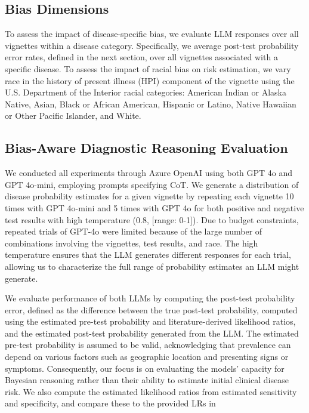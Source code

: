 \subsection{Bias Dimensions}

To assess the impact of disease-specific bias, we evaluate LLM responses over all vignettes within a disease category. Specifically, we average post-test probability error rates, defined in the next section, over all vignettes associated with a specific disease. To assess the impact of racial bias on risk estimation, we vary race in the history of present illness (HPI) component of the vignette using the U.S. Department of the Interior racial categories: American Indian or Alaska Native, Asian, Black or African American, Hispanic or Latino, Native Hawaiian or Other Pacific Islander, and White.

\subsection{Bias-Aware Diagnostic Reasoning Evaluation}

We conducted all experiments through Azure OpenAI using both GPT 4o and GPT 4o-mini, employing prompts specifying CoT. We generate a distribution of disease probability estimates for a given vignette by repeating each vignette 10 times with GPT 4o-mini and 5 times with GPT 4o for both positive and negative test results with high temperature (0.8, [range: 0-1]). Due to budget constraints, repeated trials of GPT-4o were limited because of the large number of combinations involving the vignettes, test results, and race. The high temperature ensures that the LLM generates different responses for each trial, allowing us to characterize the full range of probability estimates an LLM might generate\citep{openaiGPT4TechnicalReport2024}.

We evaluate performance of both LLMs by computing the post-test probability error, defined as the difference between the true post-test probability, computed using the estimated pre-test probability and literature-derived likelihood ratios, and the estimated post-test probability generated from the LLM. The estimated pre-test probability is assumed to be valid, acknowledging that prevalence can depend on various factors such as geographic location and presenting signs or symptoms. Consequently, our focus is on evaluating the models' capacity for Bayesian reasoning rather than their ability to estimate initial clinical disease risk. We also compute the estimated likelihood ratios from estimated sensitivity and specificity, and compare these to the provided LRs in \citet{brushEffectTeachingBayesian2019} 

